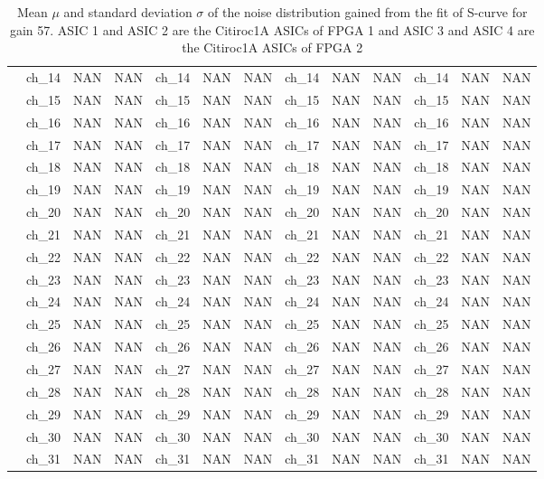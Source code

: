 \begin{table}[H]
{\begin{tabular}{|c|c|c|c|c|c|c|c|c|c|c|c|c|}
        &ch\_14 & NAN & NAN & ch\_14 & NAN & NAN & ch\_14 & NAN & NAN & ch\_14 & NAN & NAN \\
        &ch\_15 & NAN & NAN & ch\_15 & NAN & NAN & ch\_15 & NAN & NAN & ch\_15 & NAN & NAN \\
        &ch\_16 & NAN & NAN & ch\_16 & NAN & NAN & ch\_16 & NAN & NAN & ch\_16 & NAN & NAN \\
        &ch\_17 & NAN & NAN & ch\_17 & NAN & NAN & ch\_17 & NAN & NAN & ch\_17 & NAN & NAN \\
        &ch\_18 & NAN & NAN & ch\_18 & NAN & NAN & ch\_18 & NAN & NAN & ch\_18 & NAN & NAN \\
        &ch\_19 & NAN & NAN & ch\_19 & NAN & NAN & ch\_19 & NAN & NAN & ch\_19 & NAN & NAN \\
        &ch\_20 & NAN & NAN & ch\_20 & NAN & NAN & ch\_20 & NAN & NAN & ch\_20 & NAN & NAN \\
        &ch\_21 & NAN & NAN & ch\_21 & NAN & NAN & ch\_21 & NAN & NAN & ch\_21 & NAN & NAN \\
        &ch\_22 & NAN & NAN & ch\_22 & NAN & NAN & ch\_22 & NAN & NAN & ch\_22 & NAN & NAN \\
        &ch\_23 & NAN & NAN & ch\_23 & NAN & NAN & ch\_23 & NAN & NAN & ch\_23 & NAN & NAN \\
        &ch\_24 & NAN & NAN & ch\_24 & NAN & NAN & ch\_24 & NAN & NAN & ch\_24 & NAN & NAN \\
        &ch\_25 & NAN & NAN & ch\_25 & NAN & NAN & ch\_25 & NAN & NAN & ch\_25 & NAN & NAN \\
        &ch\_26 & NAN & NAN & ch\_26 & NAN & NAN & ch\_26 & NAN & NAN & ch\_26 & NAN & NAN \\
        &ch\_27 & NAN & NAN & ch\_27 & NAN & NAN & ch\_27 & NAN & NAN & ch\_27 & NAN & NAN \\
        &ch\_28 & NAN & NAN & ch\_28 & NAN & NAN & ch\_28 & NAN & NAN & ch\_28 & NAN & NAN \\
        &ch\_29 & NAN & NAN & ch\_29 & NAN & NAN & ch\_29 & NAN & NAN & ch\_29 & NAN & NAN \\
        &ch\_30 & NAN & NAN & ch\_30 & NAN & NAN & ch\_30 & NAN & NAN & ch\_30 & NAN & NAN \\
        &ch\_31 & NAN & NAN & ch\_31 & NAN & NAN & ch\_31 & NAN & NAN & ch\_31 & NAN & NAN \\
        \hline
     
    \end{tabular}
    }
    \caption{Mean $\mu$ and standard deviation $\sigma$ of the noise distribution gained from the fit of S-curve for gain 57. ASIC 1 and ASIC 2 are the Citiroc1A ASICs of FPGA 1 and ASIC 3 and ASIC 4 are the Citiroc1A ASICs of FPGA 2}
    \label{tab:noise_parameter_1}
\end{table}
